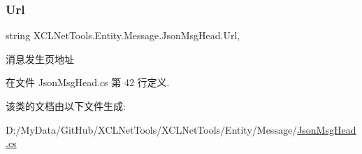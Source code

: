 \subsubsection{\texorpdfstring{Url}{Url}}
{\footnotesize\ttfamily string X\+C\+L\+Net\+Tools.\+Entity.\+Message.\+Json\+Msg\+Head.\+Url\hspace{0.3cm}{\ttfamily [get]}, {\ttfamily [set]}}



消息发生页地址 



在文件 Json\+Msg\+Head.\+cs 第 42 行定义.



该类的文档由以下文件生成\+:\begin{DoxyCompactItemize}
\item 
D\+:/\+My\+Data/\+Git\+Hub/\+X\+C\+L\+Net\+Tools/\+X\+C\+L\+Net\+Tools/\+Entity/\+Message/\hyperlink{_json_msg_head_8cs}{Json\+Msg\+Head.\+cs}\end{DoxyCompactItemize}
